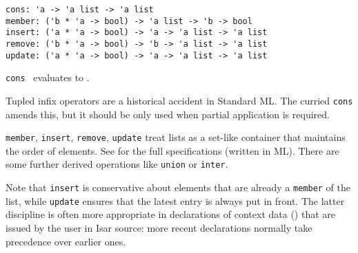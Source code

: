 \begin{isabellebody}
\begin{isamarkuptext}
\begin{mldecls}
  \verb|cons: 'a -> 'a list -> 'a list| \\
  \verb|member: ('b * 'a -> bool) -> 'a list -> 'b -> bool| \\
  \verb|insert: ('a * 'a -> bool) -> 'a -> 'a list -> 'a list| \\
  \verb|remove: ('b * 'a -> bool) -> 'b -> 'a list -> 'a list| \\
  \verb|update: ('a * 'a -> bool) -> 'a -> 'a list -> 'a list| \\
  \end{mldecls}

  \begin{description}

  \item \verb|cons|~ evaluates to .

  Tupled infix operators are a historical accident in Standard ML.
  The curried \verb|cons| amends this, but it should be only used when
  partial application is required.

  \item \verb|member|, \verb|insert|, \verb|remove|, \verb|update| treat
  lists as a set-like container that maintains the order of elements.
  See \hyperlink{file.~~/src/Pure/library.ML}{\mbox{}} for the full specifications
  (written in ML).  There are some further derived operations like
  \verb|union| or \verb|inter|.

  Note that \verb|insert| is conservative about elements that are
  already a \verb|member| of the list, while \verb|update| ensures that
  the latest entry is always put in front.  The latter discipline is
  often more appropriate in declarations of context data
  () that are issued by the user in Isar
  source: more recent declarations normally take precedence over
  earlier ones.


\end{description}
\end{isamarkuptext}
\end{isabellebody}
